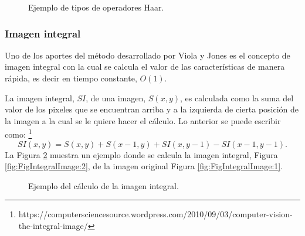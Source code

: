 \begin{figure}[h!]
\caption{Ejemplo de tipos de operadores Haar.} \label{fig:haarFeatures}
\end{figure}


\subsubsection{Imagen integral}\label{sssec:IntegralImage} 

Uno de los aportes del método desarrollado por Viola y Jones es el concepto de imagen integral con la cual se calcula el valor de las características de manera rápida, es decir en tiempo constante, $O(1)$.  

La imagen integral, $SI$, de una imagen, $S(x,y)$, es calculada como la suma del valor de los pixeles que se encuentran arriba y a la izquierda de cierta posición de la imagen a la cual se le quiere hacer el cálculo. Lo anterior se puede escribir como: \footnote{https://computersciencesource.wordpress.com/2010/09/03/computer-vision-the-integral-image/}   
\begin{equation}
SI(x,y)=S(x,y) + S(x-1,y) + SI(x,y-1)-SI(x-1,y-1).
\end{equation}   
La Figura \ref{fig:FigIntegralImage} muestra un  ejemplo donde se calcula la imagen integral, Figura \ref{fig:FigIntegralImage:2}, de la imagen original Figura \ref{fig:FigIntegralImage:1}.
\begin{figure}[h!]
\centering
{} \qquad
{}
\caption{Ejemplo del cálculo de la imagen integral.} 
\label{fig:FigIntegralImage}
\end{figure}

